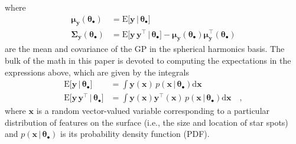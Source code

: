 \documentclass[modern]{aastex62}
\begin{document}
%
where
%
\begin{align}
    \label{eq:mean_y}
    \pmb{\mu}_{\mathbf{y}}(\pmb{\theta}_\bullet)
     & = \mathrm{E} \Big[ \mathbf{y} \, \Big| \, \pmb{\theta}_\bullet \Big]
    \\
    \label{eq:cov_y}
    \pmb{\Sigma}_{\mathbf{y}}(\pmb{\theta}_\bullet)
     & = \mathrm{E} \Big[ \mathbf{y} \, \mathbf{y}^\top \, \Big| \, \pmb{\theta}_\bullet \Big] - \pmb{\mu}_{\mathbf{y}}(\pmb{\theta}_\bullet) \pmb{\mu}_{\mathbf{y}}^\top(\pmb{\theta}_\bullet)
\end{align}
%
are the mean and covariance of the GP in the spherical harmonics basis.
The bulk of the math in this paper is devoted to computing
the expectations in the expressions above, which
are given by the integrals
%
\begin{align}
    \label{eq:exp_y}
    \mathrm{E} \Big[ \mathbf{y} \, \Big| \, \pmb{\theta}_\bullet \Big]
     & =
    \int \mathbf{y}(\mathbf{x} ) \, p(\mathbf{x} \, \big| \, \pmb{\theta}_\bullet)\mathrm{d}\mathbf{x}
    \\
    \label{eq:exp_yy}
    \mathrm{E} \Big[ \mathbf{y} \, \mathbf{y}^\top \, \Big| \, \pmb{\theta}_\bullet \Big]
     & =
    \int \mathbf{y}(\mathbf{x} ) \mathbf{y}^\top(\mathbf{x} ) \, p(\mathbf{x} \, \big| \, \pmb{\theta}_\bullet)\mathrm{d}\mathbf{x}
    \quad,
\end{align}
%
where $\mathbf{x}$ is a random vector-valued variable corresponding to a particular
distribution of features on the surface  (i.e., the size and location of star spots)
and $p(\mathbf{x} \, \big| \, \pmb{\theta}_\bullet)$ is its probability density
function (PDF).
\end{document}
